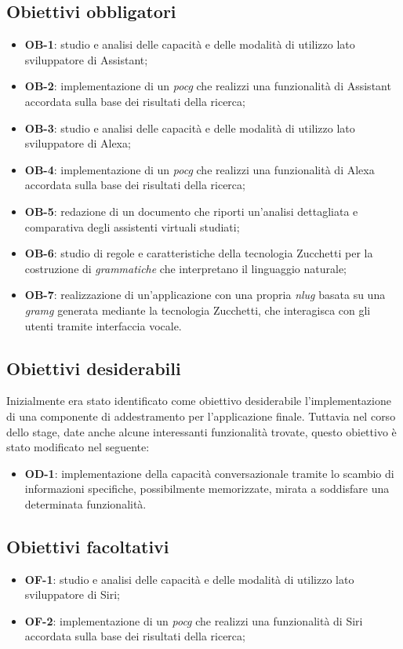 	\subsection{Obiettivi obbligatori}
	\begin{itemize}
		\item \textbf{OB-1}: studio e analisi delle capacità e delle modalità di utilizzo lato sviluppatore di Assistant;
		\item \textbf{OB-2}: implementazione di un \emph{\gls{pocg}} che realizzi una funzionalità di Assistant accordata sulla base dei risultati della ricerca;
		\item \textbf{OB-3}: studio e analisi delle capacità e delle modalità di utilizzo lato sviluppatore di Alexa;
		\item \textbf{OB-4}: implementazione di un \emph{\gls{pocg}} che realizzi una funzionalità di Alexa accordata sulla base dei risultati della ricerca;
		\item \textbf{OB-5}: redazione di un documento che riporti un'analisi dettagliata e comparativa degli assistenti virtuali studiati;
		\item \textbf{OB-6}: studio di regole e caratteristiche della tecnologia Zucchetti per la costruzione di \emph{grammatiche} che interpretano il linguaggio naturale;
		\item \textbf{OB-7}: realizzazione di un'applicazione con una propria \emph{\gls{nlug}} basata su una \emph{\gls{gramg}} generata mediante la tecnologia Zucchetti, che interagisca con gli utenti tramite interfaccia vocale.
	\end{itemize}
	\subsection{Obiettivi desiderabili}
	Inizialmente era stato identificato come obiettivo desiderabile l'implementazione di una componente di addestramento per l'applicazione finale. Tuttavia nel corso dello stage, date anche alcune interessanti funzionalità trovate, questo obiettivo è stato modificato nel seguente:
	\begin{itemize}
		\item \textbf{OD-1}: implementazione della capacità conversazionale tramite lo scambio di informazioni specifiche, possibilmente memorizzate, mirata a soddisfare una determinata funzionalità.
	\end{itemize}
	\subsection{Obiettivi facoltativi}
	\begin{itemize}
		\item \textbf{OF-1}: studio e analisi delle capacità e delle modalità di utilizzo lato sviluppatore di Siri;
		\item \textbf{OF-2}: implementazione di un \emph{\gls{pocg}} che realizzi una funzionalità di Siri accordata sulla base dei risultati della ricerca;
	\end{itemize} 

